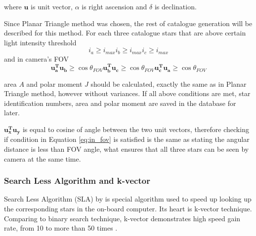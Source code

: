 \documentclass[12pt,a4paper,oneside]{article}
\begin{document}
where $\bm{u}$ is unit vector, $\alpha$ is right ascension and $\delta$ is declination.

Since Planar Triangle method was chosen, the rest of catalogue generation will be described for this method. For each three catalogue stars that are above certain light intensity threshold
\begin{subequations}
\begin{equation}
i_a \geq i_{max}
\end{equation}
\begin{equation}
i_b \geq i_{max}
\end{equation}
\begin{equation}
i_c \geq i_{max}
\end{equation}
\end{subequations}
and in camera's FOV
\begin{subequations}
\begin{equation}
\bm{u_a^T u_b} \geq \cos \theta_{FOV}
\end{equation}
\begin{equation}
\bm{u_b^T u_c} \geq \cos \theta_{FOV}
\end{equation}
\begin{equation}
\bm{u_c^T u_a} \geq \cos \theta_{FOV}
\end{equation}
\label{eq:in_fov}
\end{subequations}

area $A$ and polar moment $J$ should be calculated, exactly the same as in Planar Triangle method, however without variances. If all above conditions are met, star identification numbers, area and polar moment are saved in the database for later.

$\bm{u_x^T u_y}$ is equal to cosine of angle between the two unit vectors, therefore checking if condition in Equation \ref{eq:in_fov} is satisfied is the same as stating the angular distance is less than FOV angle, what ensures that all three stars can be seen by camera at the same time.

\subsubsection{Search Less Algorithm and k-vector}

Search Less Algorithm (SLA) by \citet{mortari1996fast} is special algorithm used to speed up looking up the corresponding stars in the on-board computer. Its heart is k-vector technique. Comparing to binary search technique, k-vector demonstrates high speed gain rate, from 10 to more than 50 times \cite{mortari2000k}.
\end{document}
